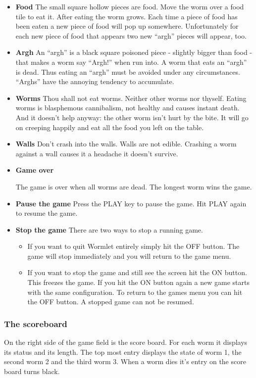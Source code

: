 \begin{itemize}
\item \textbf{Food}
The small square hollow pieces are food. Move the worm over a food tile
to eat it. After eating the worm grows. Each time a piece of food has
been eaten a new piece of food will pop up somewhere. Unfortunately for
each new piece of food that appears two new ``argh'' pieces will
appear, too.
\item \textbf{Argh}
An ``argh'' is a black square poisoned piece {}- slightly bigger than
food {}- that makes a worm say ``Argh!'' when
run into.  A worm that eats an ``argh'' is dead. Thus eating an
``argh'' must be avoided under any circumstances. ``Arghs'' have the
annoying tendency to accumulate. 
\item \textbf{Worms}
Thou shall not eat worms. Neither other worms nor thyself. Eating worms
is blasphemous cannibalism, not healthy and causes instant
death. And it doesn't help anyway: the other worm
isn't hurt by the bite. It will go on creeping happily
and eat all the food you left on the table. 
\item \textbf{Walls}
Don't crash into the walls. Walls are not edible.
Crashing a worm against a wall causes it a headache it
doesn't survive. 
\item \textbf{Game over}

The game is over when all worms are dead. The longest worm wins the
game. 
\item \textbf{Pause the game}
Press the PLAY key to pause the game. Hit PLAY again to resume the game.

\item \textbf{Stop the game}
There are two ways to stop a running game.

\begin{itemize}
\item If you want to quit Wormlet entirely simply hit the OFF button.
The game will stop immediately and you will return to the game menu. 
\item If you want to stop the game and still see the screen hit the ON
button. This freezes the game. If you hit the ON button again a new
game starts with the same configuration. To return to the games menu
you can hit the OFF button. A stopped game can not be resumed. 
\end{itemize}
\end{itemize}

\subsubsection{The scoreboard}
On the right side of the game field is the score board. For each worm it
displays its status and its length. The top most entry displays the
state of worm 1, the second worm 2 and the third worm 3. When a worm
dies it's entry on the score board turns black.

